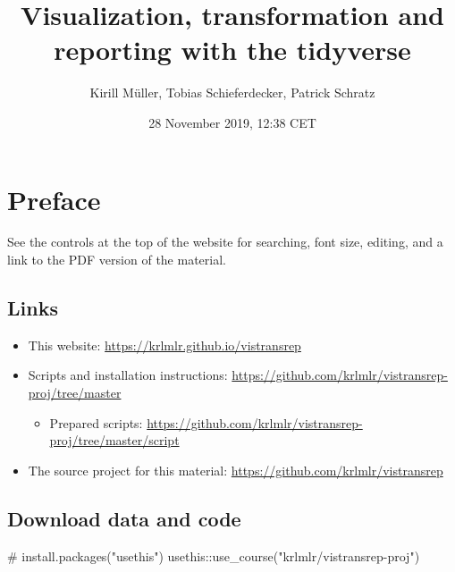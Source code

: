 \documentclass[]{book}
\title{Visualization, transformation and reporting with the tidyverse}
\author{Kirill Müller, Tobias Schieferdecker, Patrick Schratz}
\date{28 November 2019, 12:38 CET}
\newenvironment{Shaded}{}{}
\newcommand{\CommentTok}[1]{\textcolor[rgb]{0.00,0.50,0.00}{#1}}
\newcommand{\KeywordTok}[1]{\textcolor[rgb]{0.00,0.00,1.00}{#1}}
\newcommand{\NormalTok}[1]{#1}
\newcommand{\OperatorTok}[1]{#1}
\newcommand{\StringTok}[1]{\textcolor[rgb]{0.00,0.50,0.50}{#1}}
\providecommand{\tightlist}{%
  \setlength{\itemsep}{0pt}\setlength{\parskip}{0pt}}
\begin{document}
\maketitle

{
\setcounter{tocdepth}{1}
\tableofcontents
}
\hypertarget{preface}{%
\chapter*{Preface}\label{preface}}

See the controls at the top of the website for searching, font size, editing, and a link to the PDF version of the material.

\hypertarget{links}{%
\section*{Links}\label{links}}

\begin{itemize}
\item
  This website: \url{https://krlmlr.github.io/vistransrep}
\item
  Scripts and installation instructions: \url{https://github.com/krlmlr/vistransrep-proj/tree/master}

  \begin{itemize}
  \tightlist
  \item
    Prepared scripts: \url{https://github.com/krlmlr/vistransrep-proj/tree/master/script}
  \end{itemize}
\item
  The source project for this material: \url{https://github.com/krlmlr/vistransrep}
\end{itemize}

\hypertarget{download-data-and-code}{%
\section*{Download data and code}\label{download-data-and-code}}

\begin{Shaded}
\begin{Highlighting}[]
\CommentTok{# install.packages("usethis")}
\NormalTok{usethis}\OperatorTok{::}\KeywordTok{use_course}\NormalTok{(}\StringTok{"krlmlr/vistransrep-proj"}\NormalTok{)}
\end{Highlighting}
\end{Shaded}
\end{document}
